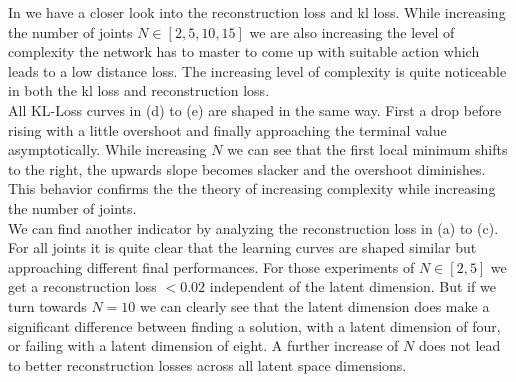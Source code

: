 In  we have a closer look into the reconstruction loss and kl loss. While increasing the number of joints $N \in [2, 5, 10, 15]$ we are also increasing the level of complexity the network has to master to come up with suitable action which leads to a low distance loss. The increasing level of complexity is quite noticeable in both the kl loss and reconstruction loss. \\
All KL-Loss curves in  (d) to (e) are shaped in the same way. First a drop before rising with a little overshoot and finally approaching the terminal value asymptotically. While increasing $N$ we can see that the first local minimum shifts to the right, the upwards slope becomes slacker and the overshoot diminishes. This behavior confirms the the theory of increasing complexity while increasing the number of joints.\\
We can find another indicator by analyzing the reconstruction loss in  (a) to (c). For all joints it is quite clear that the learning curves are shaped similar but approaching different final performances. For those experiments of $N \in [2, 5]$ we get a reconstruction loss $< 0.02$ independent of the latent dimension. But if we turn towards $N = 10$ we can clearly see that the latent dimension does make a significant difference between finding a solution, with a latent dimension of four, or failing with a latent dimension of eight. A further increase of $N$ does not lead to better reconstruction losses across all latent space dimensions. 
